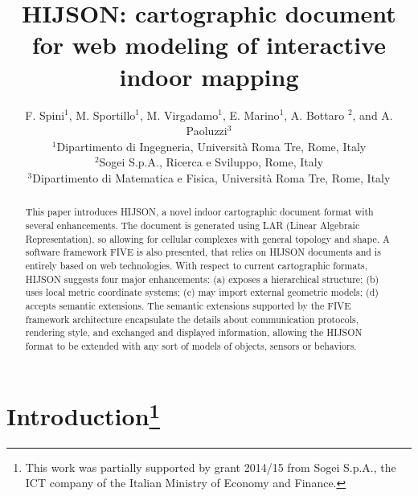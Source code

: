 \documentclass[]{egpubl}
\title[HIJSON: interactive indoor mapping]{HIJSON: cartographic document for web modeling 
of interactive indoor mapping}
\author[F. Spini, M. Sportillo, M. Virgadamo, E. Marino, A. Bottaro, \& A. Paoluzzi]
       {F. Spini$^{1}$, M. Sportillo$^{1}$, M. Virgadamo$^{1}$, E. Marino$^{1}$, A. Bottaro $^{2}$, and A. Paoluzzi$^{3}$
        \\
         $^1$Dipartimento di Ingegneria, Universit\`a Roma Tre, Rome, Italy \\
         $^2$Sogei S.p.A., Ricerca e Sviluppo, Rome, Italy \\
         $^3$Dipartimento di Matematica e Fisica, Universit\`a Roma Tre, Rome, Italy 
       }
\begin{document}

\maketitle

\begin{abstract} This paper introduces HIJSON, a novel indoor cartographic document
format with several enhancements. The document is generated using LAR (Linear Algebraic Representation), so allowing for cellular complexes with general topology and shape. 
A software framework FIVE is also presented, that relies on HIJSON
documents and is entirely based on web technologies. With respect to current
cartographic formats, HIJSON suggests four major enhancements: (a) exposes a
hierarchical structure; (b) uses local metric coordinate systems; (c) may
import external geometric models; (d) accepts semantic extensions. The
semantic extensions supported by the FIVE framework architecture encapsulate
the details about communication protocols, rendering style, and exchanged and
displayed information, allowing the HIJSON format to be extended with any sort
of models of objects, sensors or behaviors. 
\end{abstract}


\section{Introduction\footnote{This work was partially
supported by grant 2014/15 from Sogei S.p.A., the ICT company of the Italian
Ministry of Economy and Finance.}}
\end{document}
